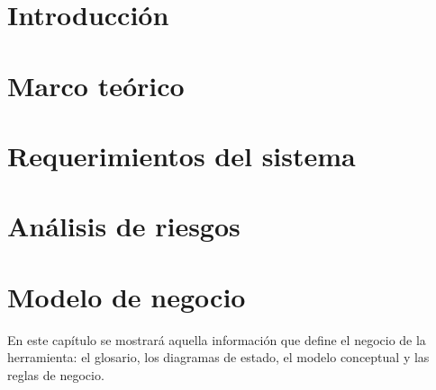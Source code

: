 \documentclass[10pt]{book}
\begin{document}

\thispagestyle{empty}


\frontmatter
\tableofcontents
\listoffigures
\mainmatter

 \hideControlVersion

\chapter{Introducción}\label{chp:introduccion}
\hypertarget{chp:introduccion}{}

\chapter{Marco teórico}\label{chp:marcoTeorico} 
\hypertarget{chp:marcoTeorico}{}
\chapter{Requerimientos del sistema}\label{chp:requerimientos}
\hypertarget{chp:requerimientos}{}
\chapter{Análisis de riesgos}\label{chp:riesgos}
\hypertarget{chp:riesgos}{}

\chapter{Modelo de negocio}\label{chp:modeloNegocios}
\hypertarget{chp:modeloNegocios}{}
En este capítulo se mostrará aquella información que define el negocio de la herramienta: el glosario, los diagramas de estado, el modelo conceptual 
y las reglas de negocio.\\
\end{document}
